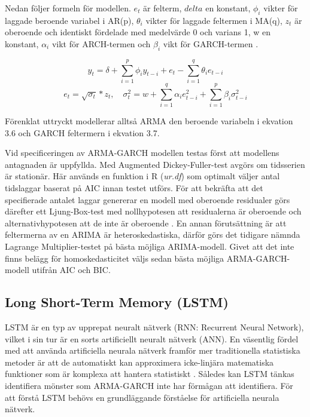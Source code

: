 \documentclass[11pt]{article}
\numberwithin{equation}{section}
\numberwithin{table}{section}
\numberwithin{figure}{section}
\begin{document}
Nedan följer formeln för modellen. \(e_t\) är felterm, \(delta\) en konstant, \(\phi_i\) vikter för laggade beroende variabel i AR(p), \(\theta_i\) vikter för laggade feltermen i MA(q), \(z_t\) är oberoende och identiskt fördelade med medelvärde 0 och varians 1, w en konstant, \(\alpha_i\) vikt för ARCH-termen och \(\beta_i\) vikt för GARCH-termen \parencite[][,s.507 ff.]{bollerslev1986generalized, montgomery2015forecasting}.

\begin{equation}
    y_t = \delta + \sum_{i=1}^{p}\phi_iy_{t-i}  +e_t - \sum_{i=1}^{q}\theta_i e_{t-i} 
\end{equation}
\begin{equation}
    e_t=\sqrt{\sigma_t}*z_t,\quad \sigma^2_t=w + \sum_{i=1}^{q}\alpha_i e^2_{t-i} + \sum_{i=1}^{p}\beta_i \sigma^2_{t-i}
\end{equation}

Förenklat uttryckt modellerar alltså ARMA den beroende variabeln i ekvation 3.6 och GARCH feltermern i ekvation 3.7. 

Vid specificeringen av ARMA-GARCH modellen testas först att modellens antagnaden är uppfyllda. Med Augmented Dickey-Fuller-test avgörs om tidsserien är stationär. Här används en funktion  i R (\textit{ur.df}) som optimalt väljer antal tidslaggar baserat på AIC innan testet utförs.  För att bekräfta att det specifierade antalet laggar genererar en modell med oberoende residualer görs därefter ett Ljung-Box-test med nollhypotesen att residualerna är oberoende och alternativhypotesen att de inte är oberoende \parencite{box1970distribution}. En annan förutsättning är att feltermerna av en ARIMA är heteroskedastiska, därför görs det tidigare nämnda Lagrange Multiplier-testet på bästa möjliga ARIMA-modell. Givet att det inte finns belägg för homoskedasticitet väljs sedan bästa möjliga ARMA-GARCH-modell utifrån AIC och BIC. 


\subsection{Long Short-Term Memory (LSTM)}
LSTM är en typ av upprepat neuralt nätverk (RNN: Recurrent Neural Network), vilket i sin tur är en sorts artificiellt neuralt nätverk (ANN). En väsentlig fördel med att använda artificiella neurala nätverk framför mer traditionella statistiska metoder är att de automatiskt kan approximera icke-linjära matematiska funktioner som är komplexa att hantera statistiskt \parencite{paliwal2009neural}. Således kan LSTM tänkas identifiera mönster som ARMA-GARCH inte har förmågan att identifiera.  För att förstå LSTM behövs en grundläggande förståelse för artificiella neurala nätverk. 
\end{document}
